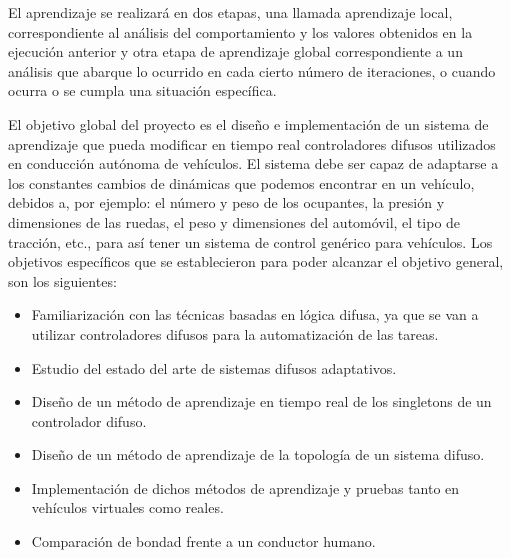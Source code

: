 El aprendizaje se realizará en dos etapas, una llamada aprendizaje local, correspondiente al análisis del comportamiento y los valores obtenidos en la ejecución anterior y otra etapa de aprendizaje global correspondiente a un análisis que abarque lo ocurrido en cada cierto número de iteraciones, o cuando ocurra o se cumpla una situación específica.       


\label{sec:ObjetivoG}

El objetivo global del proyecto es el diseño e implementación de un sistema de aprendizaje que pueda modificar en tiempo real controladores difusos utilizados en conducción autónoma de vehículos. El sistema debe ser capaz de adaptarse a los constantes cambios de dinámicas que podemos encontrar en un vehículo, debidos a, por ejemplo: el número y peso de los ocupantes, la presión y dimensiones de las ruedas, el peso y dimensiones del automóvil, el tipo de tracción, etc., para así tener un sistema de control genérico para vehículos. Los objetivos específicos que se establecieron para poder alcanzar el objetivo general, son los siguientes:

\label{sec:ObjetivoE}

\begin{itemize}
\item Familiarización con las técnicas basadas en lógica difusa, ya que se van a utilizar controladores difusos para la automatización de las tareas.
\item Estudio del estado del arte de sistemas difusos adaptativos.
\item Diseño de un método de aprendizaje en tiempo real de los singletons de un controlador difuso.
\item Diseño de un método de aprendizaje de la topología de un sistema difuso.
\item Implementación de dichos métodos de aprendizaje y pruebas tanto en vehículos virtuales como reales.
\item Comparación de bondad frente a un conductor humano.
\end{itemize}


